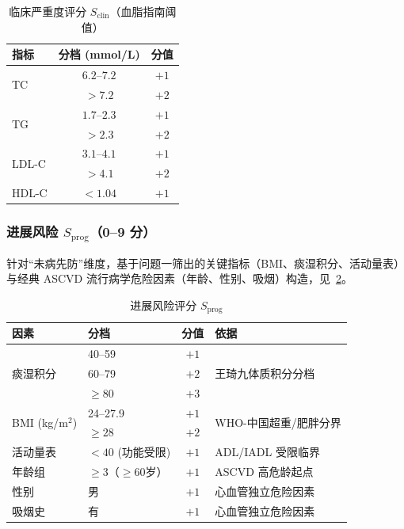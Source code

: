 \documentclass{MathorCupmodeling}
\begin{document}
\begin{table}[H]
\centering\small
\caption{\texorpdfstring{临床严重度评分 $S_{\text{clin}}$（血脂指南阈值）}{临床严重度评分 S\_clin}}\label{tab:s-clin}
\begin{tabular}{@{}l c c@{}}
\toprule
指标 & 分档 (mmol/L) & 分值 \\
\midrule
\multirow{2}{*}{TC} & $6.2$--$7.2$ & $+1$ \\
                     & $> 7.2$       & $+2$ \\
\multirow{2}{*}{TG} & $1.7$--$2.3$ & $+1$ \\
                     & $> 2.3$       & $+2$ \\
\multirow{2}{*}{LDL-C} & $3.1$--$4.1$ & $+1$ \\
                        & $> 4.1$       & $+2$ \\
HDL-C & $< 1.04$                & $+1$ \\
\bottomrule
\end{tabular}
\end{table}

\subsubsection{\texorpdfstring{进展风险 $S_{\text{prog}}$（0--9 分）}{进展风险 S\_prog}}

针对``未病先防''维度，基于问题一筛出的关键指标（BMI、痰湿积分、活动量表）与经典 ASCVD 流行病学危险因素（年龄、性别、吸烟）构造，见~\cref{tab:s-prog}。

\begin{table}[H]
\centering\small
\caption{\texorpdfstring{进展风险评分 $S_{\text{prog}}$}{进展风险评分 S\_prog}}\label{tab:s-prog}
\begin{tabular}{@{}l l c l@{}}
\toprule
因素 & 分档 & 分值 & 依据 \\
\midrule
\multirow{3}{*}{痰湿积分} & 40--59 & $+1$ & \multirow{3}{*}{王琦九体质积分分档\cite{wang2005}} \\
                          & 60--79 & $+2$ & \\
                          & $\ge 80$ & $+3$ & \\
\multirow{2}{*}{BMI (kg/m$^2$)} & 24--27.9 & $+1$ & \multirow{2}{*}{WHO-中国超重/肥胖分界} \\
                                  & $\ge 28$  & $+2$ & \\
活动量表 & $< 40$ (功能受限)    & $+1$ & ADL/IADL 受限临界\cite{katz1970,lawton1969} \\
年龄组   & $\ge 3$（$\ge 60$岁）& $+1$ & ASCVD 高危龄起点 \\
性别     & 男                    & $+1$ & 心血管独立危险因素 \\
吸烟史   & 有                    & $+1$ & 心血管独立危险因素 \\
\bottomrule
\end{tabular}
\end{table}
\end{document}
